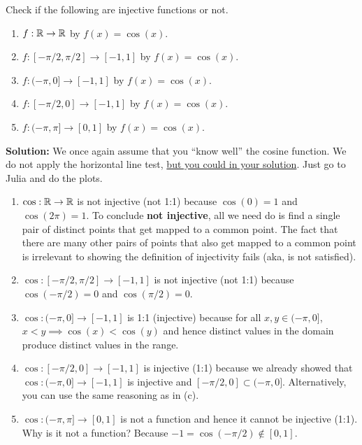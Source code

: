 \bigskip

\begin{example} Check if the following are injective functions or not.
\begin{enumerate}
\renewcommand{\labelenumi}{(\alph{enumi})}
\setlength{\itemsep}{.2cm}
    \item $f:\mathbb R \to \mathbb R$ by $f(x) = \cos(x)$.
    \item $f:[-\pi/2, \pi/2]   \to [-1, 1]$ by $f(x) = \cos(x)$.
    \item $f:(-\pi, 0] \to [-1, 1]$ by $f(x) = \cos(x)$.
    \item $f:[-\pi/2, 0] \to [-1, 1]$ by $f(x) = \cos(x)$.
    \item $f:(-\pi, \pi] \to [0, 1]$ by $f(x) = \cos(x)$.
\end{enumerate}    
\end{example}

\textbf{Solution:} We once again assume that you ``know well'' the cosine function. We do not apply the horizontal line test, \ul{but you could in your solution}. Just go to Julia and do the plots. 

\begin{enumerate}
\renewcommand{\labelenumi}{(\alph{enumi})}
\setlength{\itemsep}{.2cm}
    \item $\cos:\mathbb R \to \mathbb R$ is not injective (not 1:1) because $\cos(0)=1$ and $\cos(2 \pi) = 1$. To conclude \textbf{not injective}, all we need do is find a single pair of distinct points that get mapped to a common point. The fact that there are many other pairs of points that also get mapped to a common point is irrelevant to showing the definition of injectivity fails (aka, is not satisfied).  
    \item $\cos:[-\pi/2, \pi/2]   \to [-1, 1]$ is not injective (not 1:1) because $\cos(-\pi/2)=0$  and $\cos(\pi/2) = 0$. 
    \item $\cos:(-\pi, 0] \to [-1, 1]$ is 1:1 (injective) because for all $x, y \in (-\pi, 0]$, $x < y \implies \cos(x) < \cos(y)$ and hence distinct values in the domain produce distinct values in the range.
    \item $\cos:[-\pi/2, 0] \to [-1, 1]$  is injective (1:1) because we already showed that $\cos:(-\pi, 0] \to [-1, 1]$ is injective and $[-\pi/2, 0] \subset (-\pi, 0]$. Alternatively, you can use the same reasoning as in (c).
    \item $\cos:(-\pi, \pi] \to [0, 1]$ is not a function and hence it cannot be injective (1:1). Why is it not a function? Because $-1 = \cos(-\pi/2) \not \in [0, 1]$.
\end{enumerate}    

